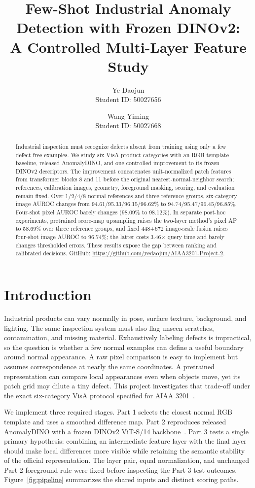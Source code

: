 \documentclass[times,10pt,twocolumn,letterpaper]{article}
\title{Few-Shot Industrial Anomaly Detection with Frozen DINOv2:\\
A Controlled Multi-Layer Feature Study}
\author{Ye Daojun\\Student ID: 50027656
\and Wang Yiming\\Student ID: 50027668}
\begin{document}
\maketitle

\begin{abstract}
Industrial inspection must recognize defects absent from training using only a few defect-free examples. We study six VisA product categories with an RGB template baseline, released AnomalyDINO, and one controlled improvement to its frozen DINOv2 descriptors. The improvement concatenates unit-normalized patch features from transformer blocks 8 and 11 before the original nearest-normal-neighbor search; references, calibration images, geometry, foreground masking, scoring, and evaluation remain fixed. Over 1/2/4/8 normal references and three reference groups, six-category image AUROC changes from 94.61/95.33/96.15/96.62\% to 94.74/95.47/96.45/96.85\%. Four-shot pixel AUROC barely changes (98.09\% to 98.12\%). In separate post-hoc experiments, pretrained score-map upsampling raises the two-layer method's pixel AP to 58.69\% over three reference groups, and fixed 448+672 image-scale fusion raises four-shot image AUROC to 96.74\%; the latter costs 3.46$\times$ query time and barely changes thresholded errors. These results expose the gap between ranking and calibrated decisions. GitHub: \url{https://github.com/yedaojun/AIAA3201-Project-2}.
\end{abstract}

\section{Introduction}
\label{sec:intro}
Industrial products can vary normally in pose, surface texture, background, and lighting. The same inspection system must also flag unseen scratches, contamination, and missing material. Exhaustively labeling defects is impractical, so the question is whether a few normal examples can define a useful boundary around normal appearance. A raw pixel comparison is easy to implement but assumes correspondence at nearly the same coordinates. A pretrained representation can compare local appearances even when objects move, yet its patch grid may dilute a tiny defect. This project investigates that trade-off under the exact six-category VisA protocol specified for AIAA 3201~\cite{zou2022visa}.

We implement three required stages. Part 1 selects the closest normal RGB template and uses a smoothed difference map. Part 2 reproduces released AnomalyDINO with a frozen DINOv2 ViT-S/14 backbone~\cite{damm2025anomalydino,oquab2024dinov2}. Part 3 tests a single primary hypothesis: combining an intermediate feature layer with the final layer should make local differences more visible while retaining the semantic stability of the official representation. The layer pair, equal normalization, and unchanged Part 2 foreground rule were fixed before inspecting the Part 3 test outcomes. Figure~\ref{fig:pipeline} summarizes the shared inputs and distinct scoring paths.
\end{document}
